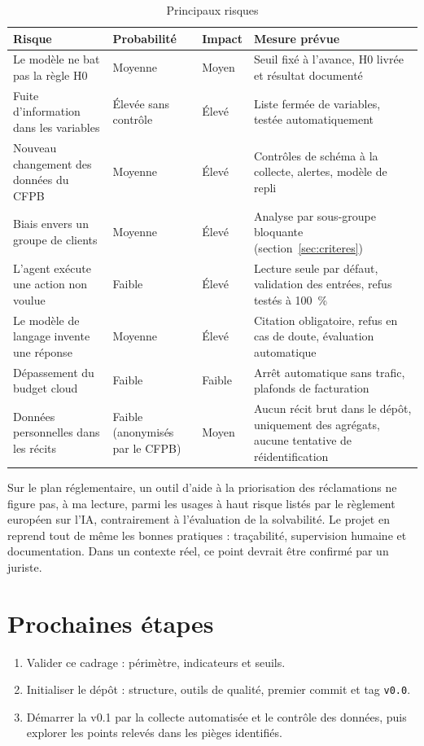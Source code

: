 \documentclass[11pt,a4paper]{article}
\begin{document}
\begin{table}[H]
\centering\small
\begin{tabularx}{\linewidth}{@{}Y l l Y@{}}
\toprule
Risque & Probabilité & Impact & Mesure prévue \\
\midrule
Le modèle ne bat pas la règle H0 & Moyenne & Moyen & Seuil fixé à l'avance, H0 livrée et résultat documenté \\
Fuite d'information dans les variables & Élevée sans contrôle & Élevé & Liste fermée de variables, testée automatiquement \\
Nouveau changement des données du CFPB & Moyenne & Élevé & Contrôles de schéma à la collecte, alertes, modèle de repli \\
Biais envers un groupe de clients & Moyenne & Élevé & Analyse par sous-groupe bloquante (section~\ref{sec:criteres}) \\
L'agent exécute une action non voulue & Faible & Élevé & Lecture seule par défaut, validation des entrées, refus testés à 100~\% \\
Le modèle de langage invente une réponse & Moyenne & Élevé & Citation obligatoire, refus en cas de doute, évaluation automatique \\
Dépassement du budget cloud & Faible & Faible & Arrêt automatique sans trafic, plafonds de facturation \\
Données personnelles dans les récits & Faible (anonymisés par le CFPB) & Moyen & Aucun récit brut dans le dépôt, uniquement des agrégats, aucune tentative de réidentification \\
\bottomrule
\end{tabularx}
\caption{Principaux risques}
\end{table}

Sur le plan réglementaire, un outil d'aide à la priorisation des réclamations ne figure pas, à ma lecture, parmi les usages à haut risque listés par le règlement européen sur l'IA, contrairement à l'évaluation de la solvabilité. Le projet en reprend tout de même les bonnes pratiques : traçabilité, supervision humaine et documentation. Dans un contexte réel, ce point devrait être confirmé par un juriste.

\section{Prochaines étapes}

\begin{enumerate}
  \item Valider ce cadrage : périmètre, indicateurs et seuils.
  \item Initialiser le dépôt : structure, outils de qualité, premier commit et tag \texttt{v0.0}.
  \item Démarrer la v0.1 par la collecte automatisée et le contrôle des données, puis explorer les points relevés dans les pièges identifiés.
\end{enumerate}
\end{document}
